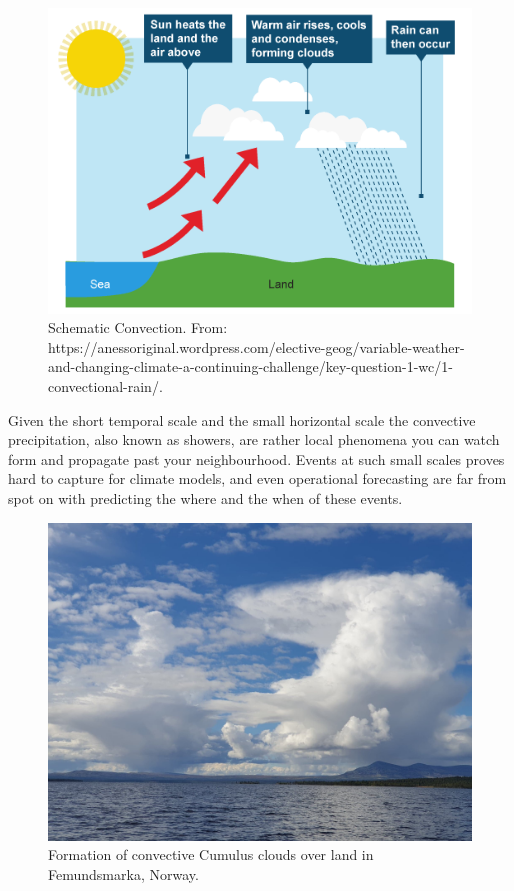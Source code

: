 \begin{figure}[hbt!]
    \centering
    \includegraphics[scale=0.4]{figures/convection-rain.png}
    \caption{Schematic Convection. From: https://anessoriginal.wordpress.com/elective-geog/variable-weather-and-changing-climate-a-continuing-challenge/key-question-1-wc/1-convectional-rain/.
    \cite{convection}}
    \label{fig:convection}
\end{figure}


Given the short temporal scale and the small horizontal scale the convective precipitation, also known as showers, are rather local phenomena you can watch form and propagate past your neighbourhood. Events at such small scales proves hard to capture for climate models, and even operational forecasting are far from spot on with predicting the where and the when of these events. 

\begin{figure}[hbt!]
    \centering
    \includegraphics[scale=0.2]{figures/cumulus_bilde.jpg}
    \caption{Formation of convective Cumulus clouds over land in Femundsmarka, Norway.
    \cite{cumulus}}
    \label{fig:cumulus}
\end{figure}

